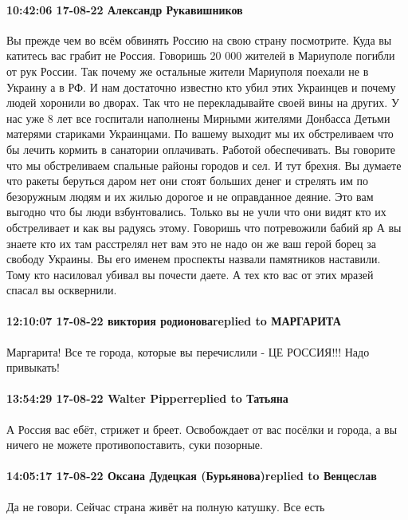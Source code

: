 \paragraph{10:42:06 17-08-22 Александр Рукавишников}

Вы прежде чем во всём обвинять Россию на свою страну посмотрите. Куда вы
катитесь вас грабит не Россия. Говоришь 20 000 жителей в Мариуполе погибли от
рук России. Так почему же остальные жители Мариуполя поехали не в Украину а в
РФ. И нам достаточно известно кто убил этих Украинцев и почему людей хоронили
во дворах. Так что не перекладывайте своей вины на других. У нас уже 8 лет все
госпитали наполнены Мирными жителями Донбасса Детьми матерями стариками
Украинцами. По вашему выходит мы их обстреливаем что бы лечить кормить в
санатории оплачивать. Работой обеспечивать. Вы говорите что мы обстреливаем
спальные районы городов и сел. И тут брехня. Вы думаете что ракеты беруться
даром нет они стоят больших денег и стрелять им по безоружным людям и их жилью
дорогое и не оправданное деяние. Это вам выгодно что бы люди взбунтовались.
Только вы не учли что они видят кто их обстреливает и как вы радуясь этому.
Говоришь что потревожили бабий яр А вы знаете кто их там расстрелял нет вам это
не надо он же ваш герой борец за свободу Украины. Вы его именем проспекты
назвали памятников наставили. Тому кто насиловал убивал вы почести даете. А тех
кто вас от этих мразей спасал вы осквернили.

\paragraph{12:10:07 17-08-22 виктория родионоваreplied to МАРГАРИТА}

Маргарита! Все те города, которые вы перечислили - ЦЕ РОССИЯ!!! Надо привыкать!

\paragraph{13:54:29 17-08-22 Walter Pipperreplied to Татьяна}

А Россия вас ебёт, стрижет и бреет. Освобождает от вас посёлки и города, а вы
ничего не можете противопоставить, суки позорные.

\paragraph{14:05:17 17-08-22 Оксана Дудецкая (Бурьянова)replied to Венцеслав}

Да не говори. Сейчас страна живёт на полную катушку. Все есть

